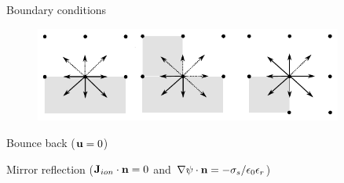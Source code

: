 \begin{frame}[t]{Boundary conditions}

\begin{itemize*}
\item[] \begin{figure}
\begin{center}
\includegraphics[width=0.9\textwidth]{../fig/bb.pdf}
\end{center}
\end{figure}

\item Bounce back ($\mathbf{u} = 0$)

\item Mirror reflection ($\mathbf{J}_{ion} \cdot \mathbf{n} = 0$ and $\nabla\mathrm{\psi}
  \cdot \mathbf{n} = -\sigma_s/\epsilon_0\epsilon_r$)

\end{itemize*}

\begin{figure}
  \hspace{5pt}
\end{figure}

\end{frame}

